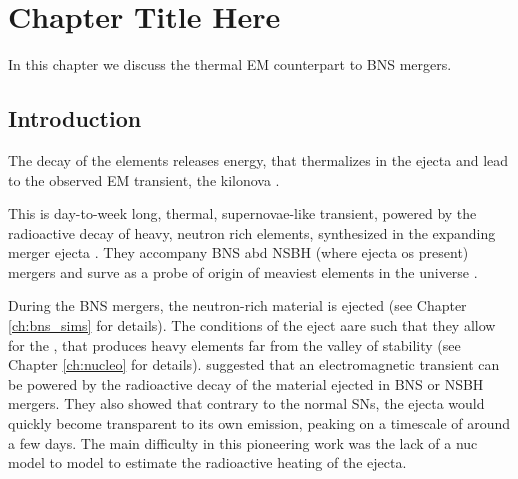 
\chapter{Chapter Title Here} %

\label{ch:kilonova} %

In this chapter we discuss the thermal \ac{EM} counterpart to \ac{BNS} mergers.



\section{Introduction}


The decay of the \rproc{} elements releases energy, that thermalizes in the ejecta 
and lead to the observed \ac{EM} transient, the kilonova \citep[\eg][]{Metzger:2016pju}.

This is day-to-week long, thermal, supernovae-like transient, powered by the radioactive decay of heavy, neutron rich elements, synthesized in the expanding merger ejecta \citep{Li:1998bw}. They accompany BNS abd NSBH (where ejecta os present) mergers and surve as a probe of origin of meaviest elements in the universe \cite{Metzger:2010}.

During the \ac{BNS} mergers, the neutron-rich material is ejected (see Chapter \ref{ch:bns_sims} for details).
The conditions of the eject aare such that they allow for the \rproc{}, that produces heavy elements 
far from the valley of stability (see Chapter \ref{ch:nucleo} for details).
\citet{Li:1998bw} suggested that an electromagnetic transient can be powered by the radioactive decay of the material ejected in \ac{BNS} or \ac{NSBH} mergers. They also showed that contrary to the normal \acp{SN}, the ejecta would quickly become transparent to its own emission, peaking on a timescale of around a few days. 
The main difficulty in this pioneering work was the lack of a \ac{nuc} model to model to estimate the radioactive heating of the ejecta. 

